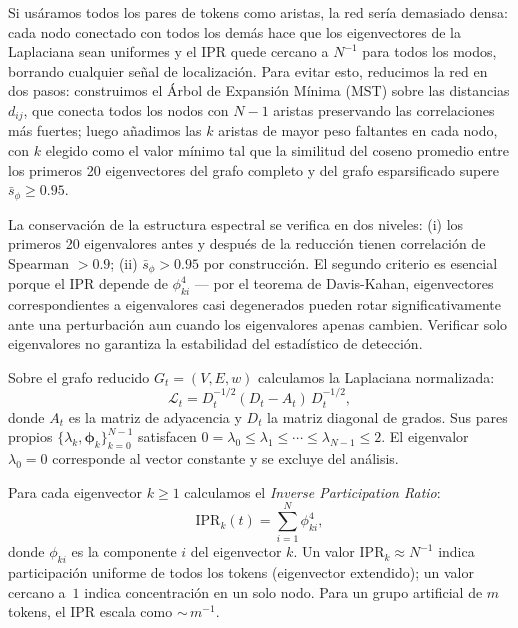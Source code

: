 Si usáramos todos los pares de tokens como aristas, la red sería
demasiado densa: cada nodo conectado con todos los demás hace que los
eigenvectores de la Laplaciana sean uniformes y el IPR quede cercano a
$N^{-1}$ para todos los modos, borrando cualquier señal de localización. Para
evitar esto, reducimos la red en dos pasos: construimos el Árbol de
Expansión Mínima (MST) sobre las distancias $d_{ij}$, que conecta todos
los nodos con $N-1$ aristas preservando las correlaciones más fuertes;
luego añadimos las $k$ aristas de mayor peso faltantes en cada nodo,
con $k$ elegido como el valor mínimo tal que la similitud del coseno
promedio entre los primeros 20 eigenvectores del grafo completo y del
grafo esparsificado supere $\bar{s}_\phi \geq 0.95$.

La conservación de la estructura espectral se verifica en dos niveles:
(i) los primeros 20 eigenvalores antes y después de la reducción tienen
correlación de Spearman $> 0.9$; (ii) $\bar{s}_\phi > 0.95$ por
construcción. El segundo criterio es esencial porque el IPR depende de
$\phi_{ki}^4$ --- por el teorema de Davis-Kahan, eigenvectores
correspondientes a eigenvalores casi degenerados pueden rotar
significativamente ante una perturbación aun cuando los eigenvalores
apenas cambien. Verificar solo eigenvalores no garantiza la estabilidad
del estadístico de detección.

Sobre el grafo reducido $G_t = (V, E, w)$ calculamos la Laplaciana
normalizada:
\begin{equation}
  \mathcal{L}_t = D_t^{-1/2}(D_t - A_t)\,D_t^{-1/2},
  \label{eq:laplacian}
\end{equation}
donde $A_t$ es la matriz de adyacencia y $D_t$ la matriz diagonal de grados.
Sus pares propios $\{\lambda_k, \boldsymbol{\phi}_k\}_{k=0}^{N-1}$ satisfacen
$0 = \lambda_0 \leq \lambda_1 \leq \cdots \leq \lambda_{N-1} \leq 2$.
El eigenvalor $\lambda_0 = 0$ corresponde al vector constante y se excluye
del análisis.

Para cada eigenvector $k \geq 1$ calculamos el \emph{Inverse Participation
Ratio}:
\begin{equation}
  \mathrm{IPR}_k(t) = \sum_{i=1}^{N} \phi_{ki}^4,
  \label{eq:ipr}
\end{equation}
donde $\phi_{ki}$ es la componente $i$ del eigenvector $k$. Un valor
$\mathrm{IPR}_k \approx N^{-1}$ indica participación uniforme de todos
los tokens (eigenvector extendido); un valor cercano a~$1$ indica
concentración en un solo nodo. Para un grupo artificial de $m$ tokens,
el IPR escala como ${\sim}\,m^{-1}$.

